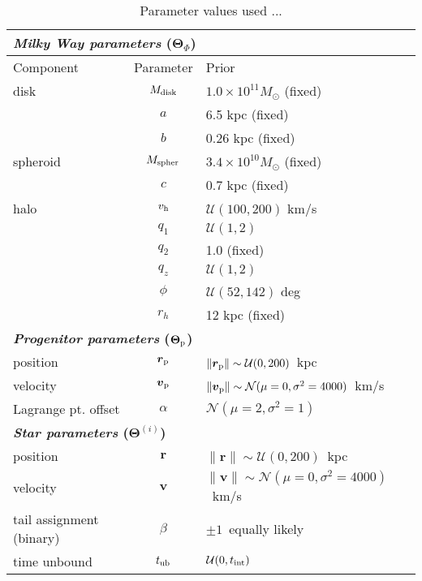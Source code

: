 \documentclass[letterpaper,12pt,preprint]{aastex}
\newcommand{\bs}{\boldsymbol}
\newcommand{\sat}{{\rm p}}
\newcommand{\tub}{t_{\rm ub}}
\newcommand{\tint}{t_{\rm int}}
\newcommand{\pshock}{P_{\rm shock}}
\newcommand{\vhalo}{v_{\rm h}}
\begin{document}
\begin{table}[h]
\begin{center}
	\begin{tabular}{l c l} \toprule
		\multicolumn{3}{l}{{\bf \emph{Milky Way parameters} ($\bs{\Theta}_\Phi$)}} \\
		\toprule
		Component & Parameter & Prior \\\toprule
		disk & $M_{\rm disk}$ & $1.0\times10^{11}M_\odot$ (fixed) \\ 
		& $a$ & 6.5 kpc (fixed)\\
		& $b$ & 0.26 kpc (fixed)\\
		\midrule
		spheroid & $M_{\rm spher}$ & $3.4\times10^{10}M_\odot$ (fixed)\\ 
		& $c$ & 0.7 kpc (fixed)\\
		\midrule
		halo & $\vhalo$ & $\mathcal{U}(100,200)$ km/s \\
		& $q_1$ & $\mathcal{U}(1,2)$\\
		& $q_2$ & 1.0 (fixed)\\
		& $q_z$ & $\mathcal{U}(1,2)$\\
		& $\phi$ & $\mathcal{U}(52,142)$ deg\\
		& $r_h$ & 12 kpc (fixed)\\
		\toprule
		\multicolumn{3}{l}{{\bf \emph{Progenitor parameters} ($\bs{\Theta}_\sat$)}} \\
		\toprule
		position & $\bs{r}_\sat$ & $\|\bs{r}_\sat\|\sim\mathcal{U}(0,200)$~kpc \\
		velocity & $\bs{v}_\sat$ & $\|\bs{v}_\sat\|\sim\mathcal{N}(\mu=0,\sigma^2=4000)$~km/s\\
		Lagrange pt. offset & $\alpha$ & $\mathcal{N}(\mu=2,\sigma^2=1)$\\
		\toprule
		\multicolumn{3}{l}{{\bf \emph{Star parameters} ($\bs{\Theta}^{(i)}$)}} \\
		\toprule
		position & $\bs{r}$ & $\|\bs{r}\|\sim\mathcal{U}(0,200)$~kpc \\
		velocity & $\bs{v}$ & $\|\bs{v}\|\sim\mathcal{N}(\mu=0,\sigma^2=4000)$~km/s\\
		tail assignment (binary) & $\beta$ & $\pm1$~equally likely\\ %
		time unbound & $\tub$ & $\mathcal{U}(0,\tint)$\\ %
		\bottomrule
		\end{tabular}
	\caption{Parameter values used ...\label{tbl:params}}
\end{center}
\end{table}
\end{document}
